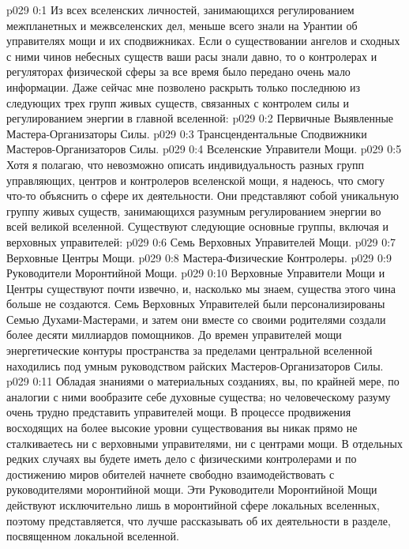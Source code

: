 \author{Вселенский Цензор}
\vs p029 0:1 Из всех вселенских личностей, занимающихся регулированием межпланетных и межвселенских дел, меньше всего знали на Урантии об управителях мощи и их сподвижниках. Если о существовании ангелов и сходных с ними чинов небесных существ ваши расы знали давно, то о контролерах и регуляторах физической сферы за все время было передано очень мало информации. Даже сейчас мне позволено раскрыть только последнюю из следующих трех групп живых существ, связанных с контролем силы и регулированием энергии в главной вселенной:
\vs p029 0:2 \pc {}\bibnobreakspace Первичные Выявленные Мастера\hyp{}Организаторы Силы.
\vs p029 0:3 \bibnobreakspace Трансцендентальные Сподвижники Мастеров\hyp{}Организаторов Силы.
\vs p029 0:4 \bibnobreakspace Вселенские Управители Мощи.
\vs p029 0:5 \pc Хотя я полагаю, что невозможно описать индивидуальность разных групп управляющих, центров и контролеров вселенской мощи, я надеюсь, что смогу что\hyp{}то объяснить о сфере их деятельности. Они представляют собой уникальную группу живых существ, занимающихся разумным регулированием энергии во всей великой вселенной. Существуют следующие основные группы, включая и верховных управителей:
\vs p029 0:6 \bibnobreakspace Семь Верховных Управителей Мощи.
\vs p029 0:7 \bibnobreakspace Верховные Центры Мощи.
\vs p029 0:8 \bibnobreakspace Мастера\hyp{}Физические Контролеры.
\vs p029 0:9 \bibnobreakspace Руководители Моронтийной Мощи.
\vs p029 0:10 \pc Верховные Управители Мощи и Центры существуют почти извечно, и, насколько мы знаем, существа этого чина больше не создаются. Семь Верховных Управителей были персонализированы Семью Духами\hyp{}Мастерами, и затем они вместе со своими родителями создали более десяти миллиардов помощников. До времен управителей мощи энергетические контуры пространства за пределами центральной вселенной находились под умным руководством райских Мастеров\hyp{}Организаторов Силы.
\vs p029 0:11 Обладая знаниями о материальных созданиях, вы, по крайней мере, по аналогии с ними вообразите себе духовные существа; но человеческому разуму очень трудно представить управителей мощи. В процессе продвижения восходящих на более высокие уровни существования вы никак прямо не сталкиваетесь ни с верховными управителями, ни с центрами мощи. В отдельных редких случаях вы будете иметь дело с физическими контролерами и по достижению миров обителей начнете свободно взаимодействовать с руководителями моронтийной мощи. Эти Руководители Моронтийной Мощи действуют исключительно лишь в моронтийной сфере локальных вселенных, поэтому представляется, что лучше рассказывать об их деятельности в разделе, посвященном локальной вселенной.
